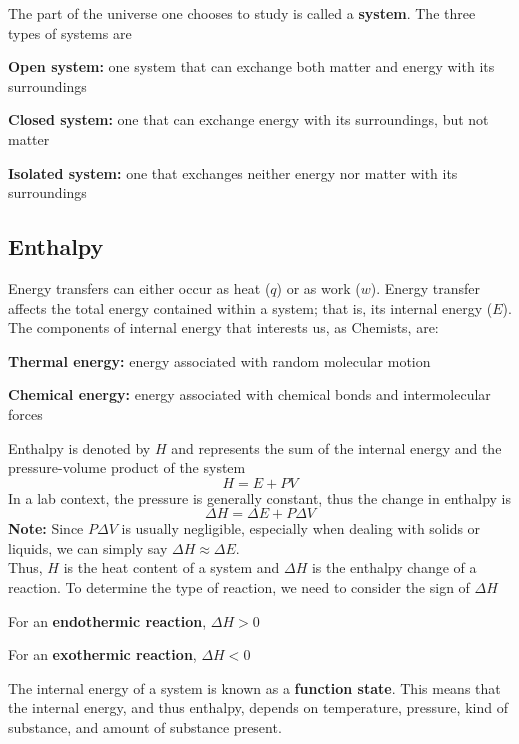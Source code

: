 The part of the universe one chooses to study is called a \textbf{system}. The three types of
systems are
\begin{enum}
    \item \textbf{Open system:} one system that can exchange both matter and energy with its
        surroundings
    \item \textbf{Closed system:} one that can exchange energy with its surroundings, but not matter
    \item \textbf{Isolated system:} one that exchanges neither energy nor matter with its
        surroundings
\end{enum}

\subsection{Enthalpy}
Energy transfers can either occur as heat ($q$) or as work ($w$). Energy transfer affects the total
energy contained within a system; that is, its internal energy ($E$).\\

The components of internal energy that interests us, as Chemists, are:
\begin{bulleted-list}
    \item \textbf{Thermal energy:} energy associated with random molecular motion
    \item \textbf{Chemical energy:} energy associated with chemical bonds and intermolecular forces
\end{bulleted-list}
Enthalpy is denoted by $H$ and represents the sum of the internal energy and the pressure-volume
product of the system
\[
    H=E+PV
\]
In a lab context, the pressure is generally constant, thus the change in enthalpy is
\[
    \Delta H=\Delta E+P\Delta V
\]
\textbf{Note:} Since $P\Delta V$ is usually negligible, especially when dealing with solids or
liquids, we can simply say $\Delta H\approx\Delta E$.\\

Thus, $H$ is the heat content of a system and $\Delta H$ is the enthalpy change of a reaction.
To determine the type of reaction, we need to consider the sign of $\Delta H$
\begin{bulleted-list}
    \item For an \textbf{endothermic reaction}, $\Delta H>0$
    \item For an \textbf{exothermic reaction}, $\Delta H<0$
\end{bulleted-list}
The internal energy of a system is known as a \textbf{function state}. This means that the internal
energy, and thus enthalpy, depends on temperature, pressure, kind of substance, and amount of 
substance present.


